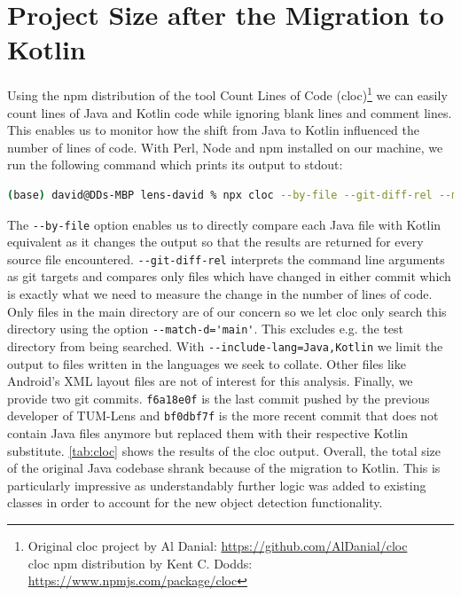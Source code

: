 \documentclass[
			   fontsize=11pt,
               paper=a4,
               bibliography=totoc,
               idxtotoc,
               headsepline,
               footsepline,
               footinclude=false,
               BCOR=12mm,
               DIV=13,
               openany,   %
               ]
               {scrbook}
\newcommand{\code}[1]{\lstinline[basicstyle = \ttfamily\small]{#1}} %
\begin{document}
\section{Project Size after the Migration to Kotlin} \label{sec:codeSizeAnalysis}

Using the npm distribution of the tool Count Lines of Code (cloc)\footnote{Original cloc project by Al Danial: \url{https://github.com/AlDanial/cloc} \\ cloc npm distribution by Kent C. Dodds: \url{https://www.npmjs.com/package/cloc}} we can easily count lines of Java and Kotlin code while ignoring blank lines and comment lines. This enables us to monitor how the shift from Java to Kotlin influenced the number of lines of code. With Perl, Node and npm installed on our machine, we run the following command which prints its output to stdout:

\begin{lstlisting}[style=standard, language=bash, label=code:cloc, caption={npx cloc command with its options and arguments. Prints the lines of code analysis comapring files before and after the Java to Kotlin conversion. The output was also saved as cloc.csv and can be found in lens-david/thesis/raw\_data.}]
	(base) david@DDs-MBP lens-david % npx cloc --by-file --git-diff-rel --match-d='main' --include-lang=Java,Kotlin -csv f6a18e0f 031a26a7
\end{lstlisting}

\noindent The \code{--by-file} option enables us to directly compare each Java file with Kotlin equivalent as it changes the output so that the results are returned for every source file encountered. \code{--git-diff-rel} interprets the command line arguments as git targets and compares only files which have changed in either commit which is exactly what we need to measure the change in the number of lines of code. Only files in the main directory are of our concern so we let cloc only search this directory using the option \code{--match-d='main'}. This excludes e.g. the test directory from being searched. With \code{--include-lang=Java,Kotlin} we limit the output to files written in the languages we seek to collate. Other files like Android's XML layout files are not of interest for this analysis. Finally, we provide two git commits. \code{f6a18e0f} is the last commit pushed by the previous developer of TUM-Lens and \code{bf0dbf7f} is the more recent commit that does not contain Java files anymore but replaced them with their respective Kotlin substitute. \autoref{tab:cloc} shows the results of the cloc output. Overall, the total size of the original Java codebase shrank because of the migration to Kotlin. This is particularly impressive as understandably further logic was added to existing classes in order to account for the new object detection functionality.
\end{document}
